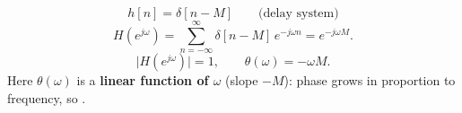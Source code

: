 \documentclass[handout_subfiles_root.tex]{subfiles}
\begin{document}
\newcommand{\HandoutPinkEmph}[1]{\textcolor{ee483pinkfg}{\mathbf{#1}}}
\newcommand{\HandoutPinkSup}[1]{{\scriptscriptstyle\HandoutPinkEmph{#1}}}
\newcommand{\HandoutEulerMark}{%
  \raisebox{-0.28ex}{\textcolor{ee483orangedot}{\fontsize{18}{18}\selectfont\textbullet}}%
}
\newcommand{\HandoutEulerMarkAnchor}{eulerCosRemark}
\newcommand{\HandoutEulerMarkLink}{%
  \hyperlink{\HandoutEulerMarkAnchor}{\HandoutEulerMark}%
}
\newcommand{\HandoutEulerMarkLinkMath}{%
  \mathord{\text{\HandoutEulerMarkLink}}%
}
\newcommand{\HandoutEulerRemarkTitleAnchor}{%
  \HandoutEulerMark\hspace{0.3em}Remark%
}
\newcommand{\HandoutPiHalfMarkAnchor}{unitCirclePiHalfRemark}
\newcommand{\HandoutPiHalfMarkLink}{%
  \hyperlink{\HandoutPiHalfMarkAnchor}{\HandoutEulerMark}%
}
\newcommand{\HandoutPiHalfMarkLinkMath}{%
  \mathord{\text{\HandoutPiHalfMarkLink}}%
}
\newcommand{\HandoutPiHalfRemarkTitleAnchor}{%
  \HandoutEulerMark\hspace{0.3em}Remark%
}
\newcommand{\HandoutEulerAddendumNoteTitle}{%
  \texorpdfstring{%
    \bfseries\itshape\hypertarget{\HandoutEulerMarkAnchor}{\HandoutEulerRemarkTitleAnchor}\hfill\normalfont\small\textit{(addendum to orig lecture note)}}{%
    Remark (addendum)}}
\newcommand{\HandoutPiHalfAddendumNoteTitle}{%
  \texorpdfstring{%
    \bfseries\itshape\hypertarget{\HandoutPiHalfMarkAnchor}{\HandoutPiHalfRemarkTitleAnchor}\hfill\normalfont\small\textit{(addendum to orig lecture note)}}{%
    Remark (addendum)}}
\maketitle


\begin{examplebox}[title={Example (Delay System)}]
\begin{equation*}
h[n] = \delta[n-M] \qquad \text{(delay system)}
\end{equation*}
\begin{equation*}
H(e^{j\omega}) = \sum_{n=-\infty}^{\infty} \delta[n-M]\,e^{-j\omega n} = e^{-j\omega M}.
\end{equation*}
\begin{equation*}
\big|H(e^{j\omega})\big| = 1, \qquad \theta(\omega) = -\omega M.
\end{equation*}
\noindent Here $\theta(\omega)$ is a \textbf{linear function of $\omega$} (slope $-M$): phase grows in proportion to frequency, so .
\end{examplebox}
\end{document}
